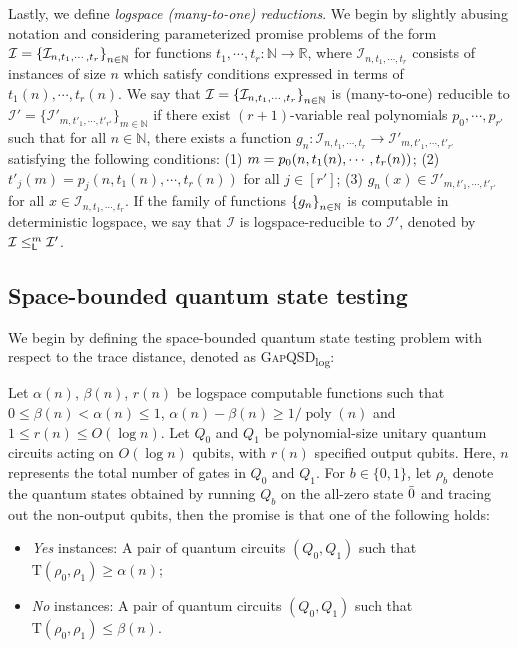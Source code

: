 \documentclass[10pt,a4paper]{article}
\numberwithin{equation}{section}
\numberwithin{figure}{section}
\newcommand{\Lspace}{\textnormal{\textsf{L}}\xspace}
\newcommand{\GapQSDlog}{\texorpdfstring{\textnormal{\textsc{GapQSD}\textsubscript{log}}}\xspace}
\DeclarePairedDelimiter\rbra{\lparen}{\rparen}
\DeclarePairedDelimiter\cbra{\{}{\}}
\let\ket\relax\DeclarePairedDelimiter\ket{\lvert}{\rangle}
\newcommand{\td}{\mathrm{T}}
\newcommand{\binset}{\{0,1\}}
\DeclareMathOperator\poly{poly}
\newcommand{\bbR}{\mathbb{R}}
\newcommand{\bbN}{\mathbb{N}}
\newcommand{\calI}{\mathcal{I}}
\begin{document}
Lastly, we define \textit{logspace \emph{(}many-to-one\emph{)} reductions}. We begin by slightly abusing notation and considering parameterized promise problems of the form $\calI = \cbra*{\calI_{n,t_1,\cdots,t_r}}_{n \in \bbN}$ for functions $t_1,\cdots,t_r \colon \bbN \rightarrow \bbR$, where $\calI_{n,t_1,\cdots,t_r}$ consists of instances of size $n$ which satisfy conditions expressed in terms of $t_1(n),\cdots,t_r(n)$. 
We say that $\calI = \cbra*{\calI_{n,t_1,\cdots,t_r}}_{n \in \bbN}$ is (many-to-one) reducible to $\calI' = \big\{\calI'_{m,t'_1,\cdots,t'_{r'}}\big\}_{m \in \bbN}$ if there exist $(r+1)$-variable real polynomials $p_0, \cdots, p_{r'}$ such that for all $n\in \bbN$, there exists a function $g_n \colon \calI_{n,t_1,\cdots,t_r} \rightarrow \calI'_{m,t'_1,\cdots,t'_{r'}}$ satisfying the following conditions: (1) $m = p_0\rbra*{n, t_1(n), \cdots, t_r(n)}$; (2) $t'_j(m) = p_j(n,t_1(n),\cdots, t_r(n))$ for all $j \in [r']$; (3) $g_n(x) \in \calI'_{m,t'_1,\cdots,t'_{r'}}$ for all $x \in \calI_{n,t_1,\cdots,t_r}$. If the family of functions $\cbra*{g_n}_{n\in \bbN}$ is computable in deterministic logspace, we say that $\calI$ is logspace-reducible to $\calI'$, denoted by $\calI \leq^m_{\Lspace} \calI'$. 

\subsection{Space-bounded quantum state testing}
\label{subsec:space-bounded-state-testing}

We begin by defining the space-bounded quantum state testing problem with respect to the trace distance, denoted as \GapQSDlog{}:

\begin{definition}
    \label{def:GapQSDlog}
    Let $\alpha(n)$, $\beta(n)$, $r(n)$ be logspace computable functions such that $0 \leq \beta(n) < \alpha(n) \leq 1$, $\alpha(n)-\beta(n) \geq 1/\!\poly(n)$ and $1 \leq r(n) \leq O(\log n)$. Let $Q_0$ and $Q_1$ be polynomial-size unitary quantum circuits acting on $O(\log n)$ qubits, with $r(n)$ specified output qubits. Here, $n$ represents the total number of gates in $Q_0$ and $Q_1$. For $b\in\binset$, let $\rho_b$ denote the quantum states obtained by running $Q_b$ on the all-zero state $\ket{\bar{0}}$ and tracing out the non-output qubits, then the promise is that one of the following holds:    
    \begin{itemize}[itemsep=0.33em,topsep=0.33em,parsep=0.33em]
        \item \emph{Yes} instances: A pair of quantum circuits $(Q_0,Q_1)$ such that $\td(\rho_0,\rho_1) \geq \alpha(n)$;
        \item \emph{No} instances: A pair of quantum circuits $(Q_0,Q_1)$ such that $\td(\rho_0,\rho_1) \leq \beta(n)$. 
    \end{itemize}
\end{definition}
\end{document}
